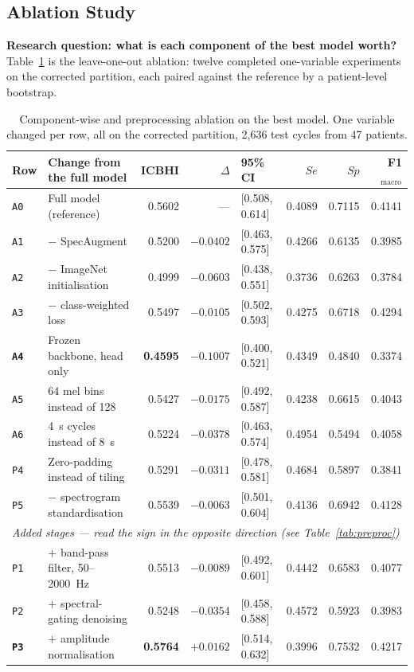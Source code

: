 \documentclass[journal,onecolumn]{IEEEtran}
\newcommand{\best}[1]{\textbf{#1}}
\begin{document}
\subsection{Ablation Study}
\label{subsec:ablation}

\textbf{Research question: what is each component of the best model worth?}
Table~\ref{tab:ablation} is the leave-one-out ablation: twelve completed
one-variable experiments on the corrected partition, each paired against the
reference by a patient-level bootstrap.

\begin{table}[!t]
\centering
\caption{Component-wise and preprocessing ablation on the best model. One variable
changed per row, all on the corrected partition, 2{,}636 test cycles from 47
patients.}
\label{tab:ablation}
\small
\begin{tabular}{llrrlrrr}
\toprule
Row & Change from the full model & ICBHI & $\Delta$ & 95\% CI & $Se$ & $Sp$ & F1$_{\text{macro}}$ \\
\midrule
\texttt{A0} & Full model (reference)          & 0.5602 & ---       & [0.508, 0.614] & 0.4089 & 0.7115 & 0.4141 \\
\texttt{A1} & $-$ SpecAugment                 & 0.5200 & $-0.0402$ & [0.463, 0.575] & 0.4266 & 0.6135 & 0.3985 \\
\texttt{A2} & $-$ ImageNet initialisation     & 0.4999 & $-0.0603$ & [0.438, 0.551] & 0.3736 & 0.6263 & 0.3784 \\
\texttt{A3} & $-$ class-weighted loss         & 0.5497 & $-0.0105$ & [0.502, 0.593] & 0.4275 & 0.6718 & 0.4294 \\
\best{\texttt{A4}} & Frozen backbone, head only & \best{0.4595} & \best{$-0.1007$} & [0.400, 0.521] & 0.4349 & 0.4840 & 0.3374 \\
\texttt{A5} & 64 mel bins instead of 128      & 0.5427 & $-0.0175$ & [0.492, 0.587] & 0.4238 & 0.6615 & 0.4043 \\
\texttt{A6} & 4~s cycles instead of 8~s       & 0.5224 & $-0.0378$ & [0.463, 0.574] & 0.4954 & 0.5494 & 0.4058 \\
\midrule
\texttt{P4} & Zero-padding instead of tiling  & 0.5291 & $-0.0311$ & [0.478, 0.581] & 0.4684 & 0.5897 & 0.3841 \\
\texttt{P5} & $-$ spectrogram standardisation & 0.5539 & $-0.0063$ & [0.501, 0.604] & 0.4136 & 0.6942 & 0.4128 \\
\midrule
\multicolumn{8}{l}{\emph{Added stages --- read the sign in the opposite direction (see Table~\ref{tab:preproc})}}\\
\texttt{P1} & $+$ band-pass filter, 50--2000~Hz & 0.5513 & $-0.0089$ & [0.492, 0.601] & 0.4442 & 0.6583 & 0.4077 \\
\texttt{P2} & $+$ spectral-gating denoising   & 0.5248 & $-0.0354$ & [0.458, 0.588] & 0.4572 & 0.5923 & 0.3983 \\
\best{\texttt{P3}} & $+$ amplitude normalisation & \best{0.5764} & \best{$+0.0162$} & [0.514, 0.632] & 0.3996 & 0.7532 & 0.4217 \\
\bottomrule
\end{tabular}


\end{table}
\end{document}
